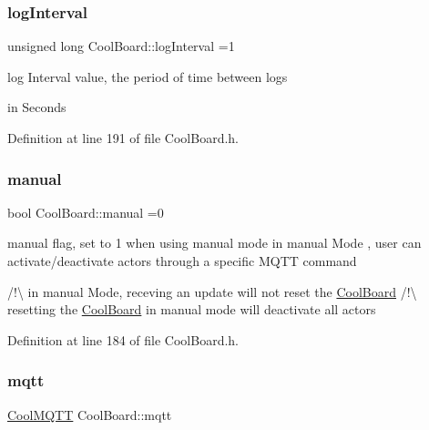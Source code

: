 \mbox{\label{class_cool_board_a84bc94413b64973e4aba8c467c97006c}} 
\subsubsection{\texorpdfstring{log\+Interval}{logInterval}}
{\footnotesize\ttfamily unsigned long Cool\+Board\+::log\+Interval =1\hspace{0.3cm}{\ttfamily [private]}}

log Interval value, the period of time between logs
\begin{DoxyItemize}
\item in Seconds 
\end{DoxyItemize}

Definition at line 191 of file Cool\+Board.\+h.

\mbox{\label{class_cool_board_a7c8e505a5804b109e112d5a03df6ea2b}} 
\subsubsection{\texorpdfstring{manual}{manual}}
{\footnotesize\ttfamily bool Cool\+Board\+::manual =0\hspace{0.3cm}{\ttfamily [private]}}

manual flag, set to 1 when using manual mode in manual Mode , user can activate/deactivate actors through a specific M\+Q\+TT command

/!\textbackslash{} in manual Mode, receving an update will not reset the \hyperlink{class_cool_board}{Cool\+Board} /!\textbackslash{} resetting the \hyperlink{class_cool_board}{Cool\+Board} in manual mode will deactivate all actors 

Definition at line 184 of file Cool\+Board.\+h.

\mbox{\label{class_cool_board_a2399f44d7c23c1149a335cb3b46d90f1}} 
\subsubsection{\texorpdfstring{mqtt}{mqtt}}
{\footnotesize\ttfamily \hyperlink{class_cool_m_q_t_t}{Cool\+M\+Q\+TT} Cool\+Board\+::mqtt\hspace{0.3cm}{\ttfamily [private]}}

